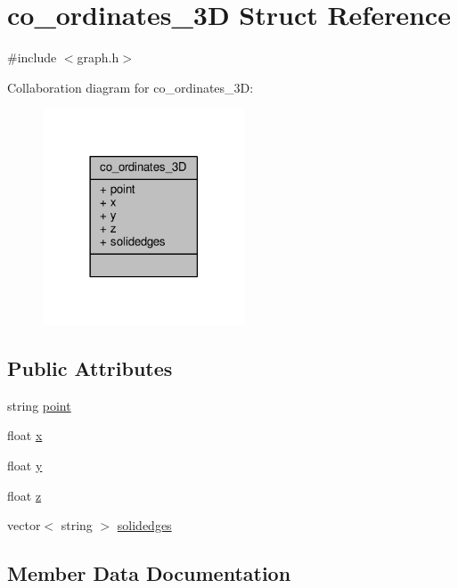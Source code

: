 \hypertarget{structco__ordinates__3D}{}\section{co\+\_\+ordinates\+\_\+3D Struct Reference}
\label{structco__ordinates__3D}


{\ttfamily \#include $<$graph.\+h$>$}



Collaboration diagram for co\+\_\+ordinates\+\_\+3D\+:
\nopagebreak
\begin{figure}[H]
\begin{center}
\leavevmode
\includegraphics[width=170pt]{structco__ordinates__3D__coll__graph}
\end{center}
\end{figure}
\subsection*{Public Attributes}
\begin{DoxyCompactItemize}
\item 
string \hyperlink{structco__ordinates__3D_a0c51eac3755997b35253e662676391bc}{point}
\item 
float \hyperlink{structco__ordinates__3D_a7fc95a1e0fbe0b7501be1d8e3dcac421}{x}
\item 
float \hyperlink{structco__ordinates__3D_a9d7588247a3b8e2344d213652ec5636a}{y}
\item 
float \hyperlink{structco__ordinates__3D_a900db1bbecab943039799a99ed30428e}{z}
\item 
vector$<$ string $>$ \hyperlink{structco__ordinates__3D_aad059234fd1b769fe491104663a63e77}{solidedges}
\end{DoxyCompactItemize}


\subsection{Member Data Documentation}
